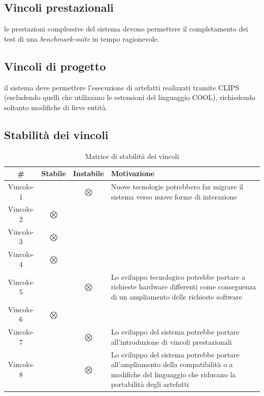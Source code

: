 \subsection{Vincoli prestazionali}
\vincolistart
	\item le prestazioni complessive del sistema devono permettere il completamento dei test di una \emph{benchmark-suite} in tempo ragionevole.
\vincoliend
\subsection{Vincoli di progetto}
\vincolistart
	\item il sistema deve permettere l'esecuzione di artefatti realizzati tramite CLIPS (escludendo quelli che utilizzano le estensioni del linguaggio COOL), richiedendo soltanto modifiche di lieve entità.
\vincoliend

\subsection{Stabilità dei vincoli}

\begin{table}[htbp]
\centering
\caption{Matrice di stabilità dei vincoli}\label{tab:stabilita-vincoli}
\begin{tabularx}{0.95\textwidth}{|c|c|c|X|}
\hline
\textbf{\#} & \textbf{Stabile} & \textbf{Instabile} & \textbf{Motivazione} \\ \hline\hline
Vincolo-1 &  & $\bigotimes$ & Nuove tecnologie potrebbero far migrare il sistema verso nuove forme di interazione \\ 
\hline 
Vincolo-2 & $\bigotimes$ &  &  \\ 
\hline 
Vincolo-3 & $\bigotimes$ & & \\ 
\hline 
Vincolo-4 & $\bigotimes$ & & \\ 
\hline 
Vincolo-5 &  & $\bigotimes$ & Lo sviluppo tecnologico potrebbe portare a richieste hardware differenti come conseguenza di un ampliamento delle richieste software \\ 
\hline 
Vincolo-6 & $\bigotimes$ & & \\ 
\hline 
Vincolo-7 & & $\bigotimes$ & Lo sviluppo del sistema potrebbe portare all'introduzione di vincoli prestazionali \\ 
\hline 
Vincolo-8 & & $\bigotimes$ & Lo sviluppo del sistema potrebbe portare all'ampliamento della compatibilità o a modifiche del linguaggio che riducano la portabilità degli artefatti\\ 
\hline
\end{tabularx} 
\end{table}

